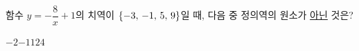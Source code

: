 \hspace*{2mm}\begin{minipage}[t]{\dimexpr\linewidth-2mm\relax}\vspace{0pt}
함수 $y=-\dfrac{8}{x}+1$의 치역이 $\{-3,\mkern3mu -1,\mkern3mu 5,\mkern3mu 9\}$일 때, 다음 중 정의역의 원소가 \underline{아닌} 것은?
\begin{choices32}{$-2$}{$-1$}{$1$}{$2$}{$4$}\end{choices32}\end{minipage}
